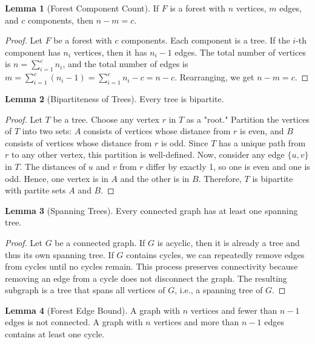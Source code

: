 \documentclass{article}
\theoremstyle{definition}
\newtheorem{lemma}{Lemma}
\begin{document}
\begin{lemma}[Forest Component Count]
If $F$ is a forest with $n$ vertices, $m$ edges, and $c$ components, then $n - m = c$.
\end{lemma}

\begin{proof}
Let $F$ be a forest with $c$ components. Each component is a tree. If the $i$-th component has $n_i$ vertices, then it has $n_i - 1$ edges. The total number of vertices is $n = \sum_{i=1}^{c} n_i$, and the total number of edges is $m = \sum_{i=1}^{c} (n_i - 1) = \sum_{i=1}^{c} n_i - c = n - c$. Rearranging, we get $n - m = c$.
\end{proof}

\begin{lemma}[Bipartiteness of Trees]
Every tree is bipartite.
\end{lemma}

\begin{proof}
Let $T$ be a tree. Choose any vertex $r$ in $T$ as a "root." Partition the vertices of $T$ into two sets: $A$ consists of vertices whose distance from $r$ is even, and $B$ consists of vertices whose distance from $r$ is odd. Since $T$ has a unique path from $r$ to any other vertex, this partition is well-defined. Now, consider any edge $\{u, v\}$ in $T$. The distances of $u$ and $v$ from $r$ differ by exactly 1, so one is even and one is odd. Hence, one vertex is in $A$ and the other is in $B$. Therefore, $T$ is bipartite with partite sets $A$ and $B$.
\end{proof}

\begin{lemma}[Spanning Trees]
Every connected graph has at least one spanning tree.
\end{lemma}

\begin{proof}
Let $G$ be a connected graph. If $G$ is acyclic, then it is already a tree and thus its own spanning tree. If $G$ contains cycles, we can repeatedly remove edges from cycles until no cycles remain. This process preserves connectivity because removing an edge from a cycle does not disconnect the graph. The resulting subgraph is a tree that spans all vertices of $G$, i.e., a spanning tree of $G$.
\end{proof}

\begin{lemma}[Forest Edge Bound]
A graph with $n$ vertices and fewer than $n-1$ edges is not connected. A graph with $n$ vertices and more than $n-1$ edges contains at least one cycle.
\end{lemma}
\end{document}
